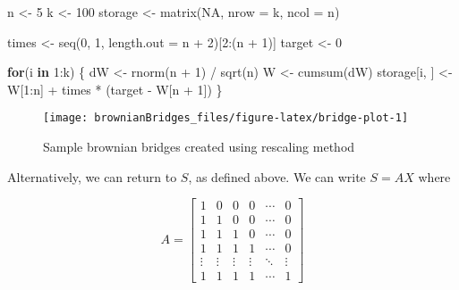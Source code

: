 \documentclass[
]{article}
\newenvironment{Shaded}{\begin{snugshade}}{\end{snugshade}}
\newcommand{\AttributeTok}[1]{\textcolor[rgb]{0.77,0.63,0.00}{#1}}
\newcommand{\ConstantTok}[1]{\textcolor[rgb]{0.00,0.00,0.00}{#1}}
\newcommand{\ControlFlowTok}[1]{\textcolor[rgb]{0.13,0.29,0.53}{\textbf{#1}}}
\newcommand{\DecValTok}[1]{\textcolor[rgb]{0.00,0.00,0.81}{#1}}
\newcommand{\FunctionTok}[1]{\textcolor[rgb]{0.00,0.00,0.00}{#1}}
\newcommand{\NormalTok}[1]{#1}
\newcommand{\OtherTok}[1]{\textcolor[rgb]{0.56,0.35,0.01}{#1}}
\newcommand{\SpecialCharTok}[1]{\textcolor[rgb]{0.00,0.00,0.00}{#1}}
\begin{document}
\begin{Shaded}
\begin{Highlighting}[]
\NormalTok{n }\OtherTok{\textless{}{-}} \DecValTok{5}
\NormalTok{k }\OtherTok{\textless{}{-}} \DecValTok{100}
\NormalTok{storage }\OtherTok{\textless{}{-}} \FunctionTok{matrix}\NormalTok{(}\ConstantTok{NA}\NormalTok{, }\AttributeTok{nrow =}\NormalTok{ k, }\AttributeTok{ncol =}\NormalTok{ n)}

\NormalTok{times }\OtherTok{\textless{}{-}} \FunctionTok{seq}\NormalTok{(}\DecValTok{0}\NormalTok{, }\DecValTok{1}\NormalTok{, }\AttributeTok{length.out =}\NormalTok{ n }\SpecialCharTok{+} \DecValTok{2}\NormalTok{)[}\DecValTok{2}\SpecialCharTok{:}\NormalTok{(n }\SpecialCharTok{+} \DecValTok{1}\NormalTok{)]}
\NormalTok{target }\OtherTok{\textless{}{-}} \DecValTok{0}

\ControlFlowTok{for}\NormalTok{(i }\ControlFlowTok{in} \DecValTok{1}\SpecialCharTok{:}\NormalTok{k) \{}
\NormalTok{  dW }\OtherTok{\textless{}{-}} \FunctionTok{rnorm}\NormalTok{(n }\SpecialCharTok{+} \DecValTok{1}\NormalTok{) }\SpecialCharTok{/} \FunctionTok{sqrt}\NormalTok{(n)}
\NormalTok{  W }\OtherTok{\textless{}{-}} \FunctionTok{cumsum}\NormalTok{(dW)}
\NormalTok{  storage[i, ] }\OtherTok{\textless{}{-}}\NormalTok{ W[}\DecValTok{1}\SpecialCharTok{:}\NormalTok{n] }\SpecialCharTok{+}\NormalTok{ times }\SpecialCharTok{*}\NormalTok{ (target }\SpecialCharTok{{-}}\NormalTok{ W[n }\SpecialCharTok{+} \DecValTok{1}\NormalTok{])}
\NormalTok{\}}
\end{Highlighting}
\end{Shaded}

\begin{figure}
\texttt{[image: brownianBridges\_files/figure-latex/bridge-plot-1]} \caption{Sample brownian bridges created using rescaling method}\label{fig:bridge-plot}
\end{figure}

Alternatively, we can return to \(S\), as defined above. We can write \(S = AX\) where

\[
  A = 
  \begin{bmatrix} 
    1 & 0 & 0 & 0 & \cdots & 0 \\
    1 & 1 & 0 & 0 & \cdots & 0 \\
    1 & 1 & 1 & 0 & \cdots & 0 \\
    1 & 1 & 1 & 1 & \cdots & 0 \\
    \vdots & \vdots & \vdots & \vdots & \ddots & \vdots \\
    1 & 1 & 1 & 1 & \cdots & 1
  \end{bmatrix}
\]
\end{document}
